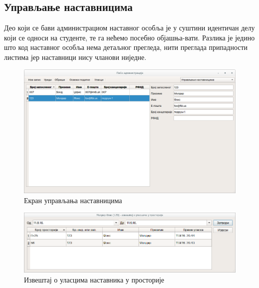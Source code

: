 \documentclass[a4paper, 12pt, diplomski]{etfcyr}
\begin{document}
			\subsection{Управљање наставницима}
				\begin{justify}
					Део који се бави администрациом наставног особља је у суштини идентичан делу који се односи на студенте, те га нећемо посебно објашња-вати. Разлика је једино што код наставног особља нема детаљног прегледа, нити преглада припадности листима јер наставници нису чланови ниједне.
					\begin{figure}[h]
						\begin{center}
							\includegraphics[width=1.0\textwidth]{manual/teachers_main_window.png}
						\end{center}
						\caption{Екран управљања наставницима}
						\label{figure:teachers_main_window}
					\end{figure}
					\begin{figure}[H]
						\begin{center}
							\includegraphics[width=1.0\textwidth]{manual/teacher_entries.png}
						\end{center}
						\caption{Извештај о уласцима наставника у просторије}
						\label{figure:teacher_entries}
					\end{figure}
				\end{justify}
\end{document}
